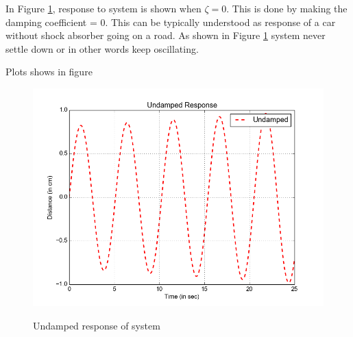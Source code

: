 \documentclass[a4paper,12pt,twocolumn]{article}
\newcommand*{\MyPath}{../latex-files}%
\begin{document}
In Figure \ref{fig:undamped}, response to system is shown when $\zeta = 0$. This is done by making the damping coefficient = 0. This can be typically understood as response of a car without shock absorber going on a road. As shown in Figure \ref{fig:undamped} system never settle down or in other words keep oscillating.

Plots shows in figure 
\begin{figure}
\centering
\includegraphics[scale = 0.5]{Undamped_Response}
\label{fig:undamped}
\caption{Undamped response of system}
\end{figure}



\end{document}
